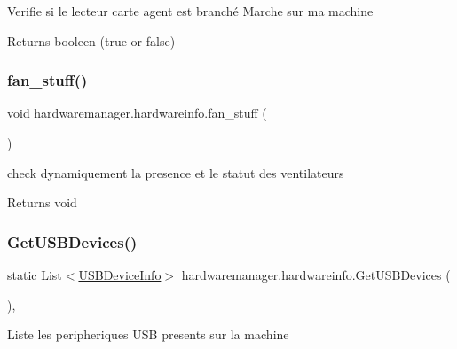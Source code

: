 Verifie si le lecteur carte agent est branché Marche sur ma machine 

\begin{DoxyReturn}{Returns}
booleen (true or false)
\end{DoxyReturn}
\mbox{\label{classhardwaremanager_1_1hardwareinfo_ac15b4493df355c3b406f9bfd0c0e2671}} 
\subsubsection{\texorpdfstring{fan\+\_\+stuff()}{fan\_stuff()}}
{\footnotesize\ttfamily void hardwaremanager.\+hardwareinfo.\+fan\+\_\+stuff (\begin{DoxyParamCaption}{ }\end{DoxyParamCaption})}



check dynamiquement la presence et le statut des ventilateurs 

\begin{DoxyReturn}{Returns}
void
\end{DoxyReturn}
\mbox{\label{classhardwaremanager_1_1hardwareinfo_a23bffbb039851e238039b3f18f808efd}} 
\subsubsection{\texorpdfstring{Get\+U\+S\+B\+Devices()}{GetUSBDevices()}}
{\footnotesize\ttfamily static List$<$\hyperlink{classhardwaremanager_1_1_u_s_b_device_info}{U\+S\+B\+Device\+Info}$>$ hardwaremanager.\+hardwareinfo.\+Get\+U\+S\+B\+Devices (\begin{DoxyParamCaption}{ }\end{DoxyParamCaption})\hspace{0.3cm}{\ttfamily [static]}, {\ttfamily [private]}}



Liste les peripheriques U\+SB presents sur la machine 

